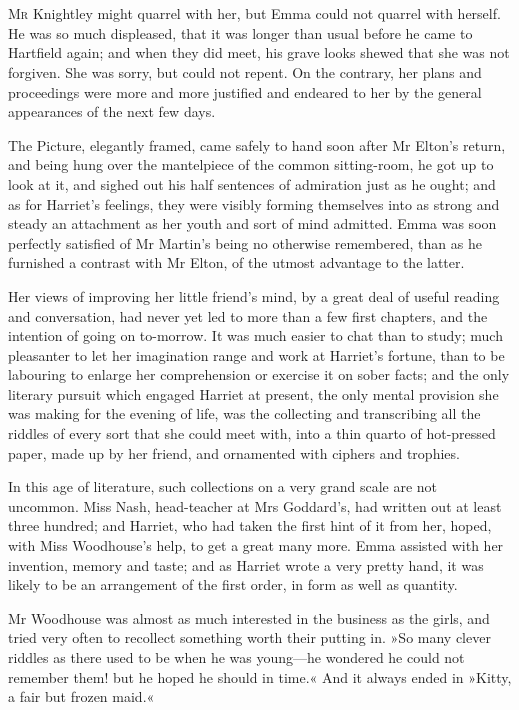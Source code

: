 \chapter[Chapter \thechapter]{}
\lettrine[lines=4,lraise=0.3]{M}{r} Knightley might quarrel with her, but Emma could not quarrel with herself. He was so much displeased, that it was longer than usual before he came to Hartfield again; and when they did meet, his grave looks shewed that she was not forgiven. She was sorry, but could not repent. On the contrary, her plans and proceedings were more and more justified and endeared to her by the general appearances of the next few days.

The Picture, elegantly framed, came safely to hand soon after Mr Elton's return, and being hung over the mantelpiece of the common sitting-room, he got up to look at it, and sighed out his half sentences of admiration just as he ought; and as for Harriet's feelings, they were visibly forming themselves into as strong and steady an attachment as her youth and sort of mind admitted. Emma was soon perfectly satisfied of Mr Martin's being no otherwise remembered, than as he furnished a contrast with Mr Elton, of the utmost advantage to the latter.

Her views of improving her little friend's mind, by a great deal of useful reading and conversation, had never yet led to more than a few first chapters, and the intention of going on to-morrow. It was much easier to chat than to study; much pleasanter to let her imagination range and work at Harriet's fortune, than to be labouring to enlarge her comprehension or exercise it on sober facts; and the only literary pursuit which engaged Harriet at present, the only mental provision she was making for the evening of life, was the collecting and transcribing all the riddles of every sort that she could meet with, into a thin quarto of hot-pressed paper, made up by her friend, and ornamented with ciphers and trophies.

In this age of literature, such collections on a very grand scale are not uncommon. Miss Nash, head-teacher at Mrs Goddard's, had written out at least three hundred; and Harriet, who had taken the first hint of it from her, hoped, with Miss Woodhouse's help, to get a great many more. Emma assisted with her invention, memory and taste; and as Harriet wrote a very pretty hand, it was likely to be an arrangement of the first order, in form as well as quantity.

Mr Woodhouse was almost as much interested in the business as the girls, and tried very often to recollect something worth their putting in. »So many clever riddles as there used to be when he was young—he wondered he could not remember them! but he hoped he should in time.« And it always ended in »Kitty, a fair but frozen maid.«

